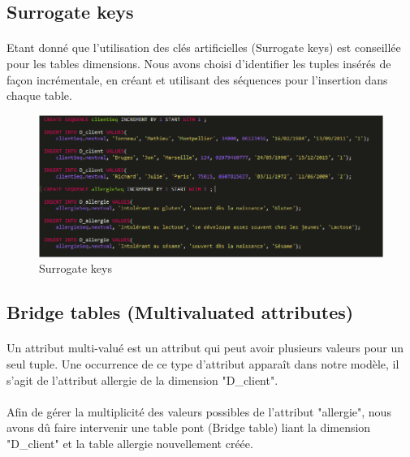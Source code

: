 \subsection{Surrogate keys}
\paragraph{} Etant donné que l’utilisation des clés artificielles (Surrogate keys) est conseillée pour les tables dimensions. Nous avons choisi d’identifier les tuples insérés de façon incrémentale, en créant et utilisant des séquences pour l’insertion dans chaque table.

    \begin{figure}[h]
        \centerline{\includegraphics[scale=0.7]{Surrogate.png}}
        \caption{Surrogate keys}
        \label{fig:UML}
    \end{figure}

    
\subsection{Bridge tables (Multivaluated attributes)}
\paragraph{} Un attribut multi-valué est un attribut qui peut avoir plusieurs valeurs pour un seul tuple. Une occurrence de ce type d’attribut apparaît dans notre modèle, il s’agit de l’attribut allergie de la dimension "D\_client".
\paragraph{} Afin de gérer la multiplicité des valeurs possibles de l’attribut "allergie", nous avons dû faire intervenir une table pont (Bridge table) liant la dimension "D\_client" et la table allergie nouvellement créée.

